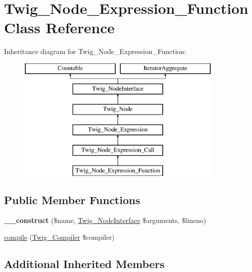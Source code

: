 \hypertarget{class_twig___node___expression___function}{}\section{Twig\+\_\+\+Node\+\_\+\+Expression\+\_\+\+Function Class Reference}
\label{class_twig___node___expression___function}
Inheritance diagram for Twig\+\_\+\+Node\+\_\+\+Expression\+\_\+\+Function\+:\begin{figure}[H]
\begin{center}
\leavevmode
\includegraphics[height=6.000000cm]{class_twig___node___expression___function}
\end{center}
\end{figure}
\subsection*{Public Member Functions}
\begin{DoxyCompactItemize}
\item 
\hypertarget{class_twig___node___expression___function_a38ef75f1dd2ff8264797791ff87b6648}{}{\bfseries \+\_\+\+\_\+construct} (\$name, \hyperlink{interface_twig___node_interface}{Twig\+\_\+\+Node\+Interface} \$arguments, \$lineno)\label{class_twig___node___expression___function_a38ef75f1dd2ff8264797791ff87b6648}

\item 
\hyperlink{class_twig___node___expression___function_a4e0faa87c3fae583620b84d3607085da}{compile} (\hyperlink{class_twig___compiler}{Twig\+\_\+\+Compiler} \$compiler)
\end{DoxyCompactItemize}
\subsection*{Additional Inherited Members}


